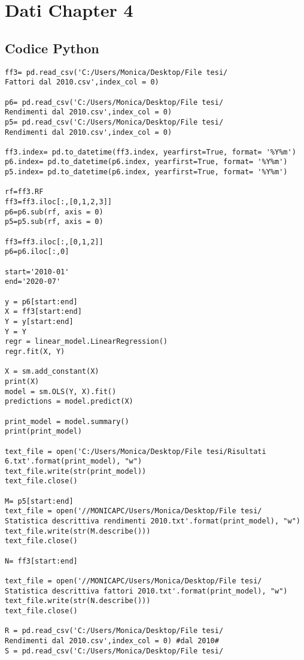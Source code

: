 \appendix
\chapter{Dati Chapter 4}
\section{Codice Python}

\begin{verbatim}
ff3= pd.read_csv('C:/Users/Monica/Desktop/File tesi/
Fattori dal 2010.csv',index_col = 0)

p6= pd.read_csv('C:/Users/Monica/Desktop/File tesi/
Rendimenti dal 2010.csv',index_col = 0)
p5= pd.read_csv('C:/Users/Monica/Desktop/File tesi/
Rendimenti dal 2010.csv',index_col = 0) 

ff3.index= pd.to_datetime(ff3.index, yearfirst=True, format= '%Y%m') 
p6.index= pd.to_datetime(p6.index, yearfirst=True, format= '%Y%m')
p5.index= pd.to_datetime(p6.index, yearfirst=True, format= '%Y%m')

rf=ff3.RF
ff3=ff3.iloc[:,[0,1,2,3]]
p6=p6.sub(rf, axis = 0)
p5=p5.sub(rf, axis = 0)

ff3=ff3.iloc[:,[0,1,2]] 
p6=p6.iloc[:,0]  

start='2010-01'
end='2020-07'

y = p6[start:end]
X = ff3[start:end]
Y = y[start:end]
Y = Y
regr = linear_model.LinearRegression()
regr.fit(X, Y)

X = sm.add_constant(X)
print(X)
model = sm.OLS(Y, X).fit()
predictions = model.predict(X)

print_model = model.summary()
print(print_model)

text_file = open('C:/Users/Monica/Desktop/File tesi/Risultati 
6.txt'.format(print_model), "w")
text_file.write(str(print_model))
text_file.close()

M= p5[start:end]
text_file = open('//MONICAPC/Users/Monica/Desktop/File tesi/
Statistica descrittiva rendimenti 2010.txt'.format(print_model), "w")
text_file.write(str(M.describe()))
text_file.close()

N= ff3[start:end]

text_file = open('//MONICAPC/Users/Monica/Desktop/File tesi/
Statistica descrittiva fattori 2010.txt'.format(print_model), "w")
text_file.write(str(N.describe()))
text_file.close()

R = pd.read_csv('C:/Users/Monica/Desktop/File tesi/
Rendimenti dal 2010.csv',index_col = 0) #dal 2010#
S = pd.read_csv('C:/Users/Monica/Desktop/File tesi/


\end{verbatim}
